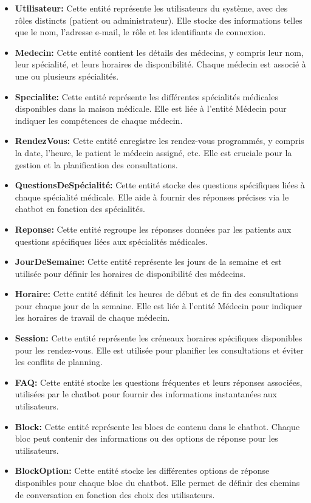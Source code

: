 \begin{itemize}
  \item \textbf{Utilisateur: }Cette entité représente les utilisateurs du système, avec des rôles distincts (patient ou administrateur). Elle stocke des informations telles que le nom, l'adresse e-mail, le rôle et les identifiants de connexion.
  \item \textbf{Medecin: }Cette entité contient les détails des médecins, y compris leur nom, leur spécialité, et leurs horaires de disponibilité. Chaque médecin est associé à une ou plusieurs spécialités.
  \item \textbf{Specialite: }Cette entité représente les différentes spécialités médicales disponibles dans la maison médicale. Elle est liée à l'entité Médecin pour indiquer les compétences de chaque médecin.
  \item \textbf{RendezVous: }Cette entité enregistre les rendez-vous programmés, y compris la date, l'heure, le patient le médecin assigné, etc. Elle est cruciale pour la gestion et la planification des consultations.
  \item \textbf{QuestionsDeSpécialité: }Cette entité stocke des questions spécifiques liées à chaque spécialité médicale. Elle aide à fournir des réponses précises via le chatbot en fonction des spécialités.
  \item \textbf{Reponse: }Cette entité regroupe les réponses données par les patients aux questions spécifiques liées aux spécialités médicales.
  \item \textbf{JourDeSemaine: }Cette entité représente les jours de la semaine et est utilisée pour définir les horaires de disponibilité des médecins.
  \item \textbf{Horaire: }Cette entité définit les heures de début et de fin des consultations pour chaque jour de la semaine. Elle est liée à l'entité Médecin pour indiquer les horaires de travail de chaque médecin.
  \item \textbf{Session: }Cette entité représente les créneaux horaires spécifiques disponibles pour les rendez-vous. Elle est utilisée pour planifier les consultations et éviter les conflits de planning.
  \item \textbf{FAQ: }Cette entité stocke les questions fréquentes et leurs réponses associées, utilisées par le chatbot pour fournir des informations instantanées aux utilisateurs.
  \item \textbf{Block: }Cette entité représente les blocs de contenu dans le chatbot. Chaque bloc peut contenir des informations ou des options de réponse pour les utilisateurs.
  \item \textbf{BlockOption: }Cette entité stocke les différentes options de réponse disponibles pour chaque bloc du chatbot. Elle permet de définir des chemins de conversation en fonction des choix des utilisateurs.
\end{itemize}

